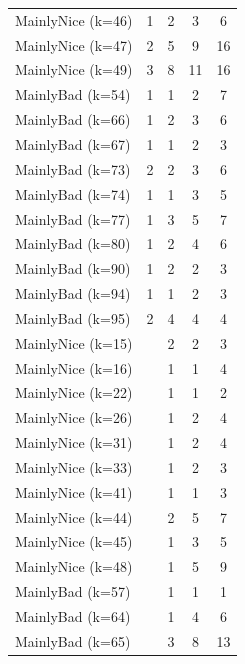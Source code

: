 \documentclass[journal,10pt,twoside]{IEEEtran}
\begin{document}
\begin{table}[ht]
\begin{minipage}{.35\textwidth}
\begin{tabular}{l|cccc}
        MainlyNice (k=46)    &    1 &    2 &    3 &    6 \\
        MainlyNice (k=47)    &    2 &    5 &    9 &   16 \\
        MainlyNice (k=49)    &    3 &    8 &   11 &   16 \\
        MainlyBad (k=54)     &    1 &    1 &    2 &    7 \\
        MainlyBad (k=66)     &    1 &    2 &    3 &    6 \\
        MainlyBad (k=67)     &    1 &    1 &    2 &    3 \\
        MainlyBad (k=73)     &    2 &    2 &    3 &    6 \\
        MainlyBad (k=74)     &    1 &    1 &    3 &    5 \\
        MainlyBad (k=77)     &    1 &    3 &    5 &    7 \\
        MainlyBad (k=80)     &    1 &    2 &    4 &    6 \\
        MainlyBad (k=90)     &    1 &    2 &    2 &    3 \\
        MainlyBad (k=94)     &    1 &    1 &    2 &    3 \\
        MainlyBad (k=95)     &    2 &    4 &    4 &    4 \\
        MainlyNice (k=15)    &      &    2 &    2 &    3 \\
        MainlyNice (k=16)    &      &    1 &    1 &    4 \\
        MainlyNice (k=22)    &      &    1 &    1 &    2 \\
        MainlyNice (k=26)    &      &    1 &    2 &    4 \\
        MainlyNice (k=31)    &      &    1 &    2 &    4 \\
        MainlyNice (k=33)    &      &    1 &    2 &    3 \\
        MainlyNice (k=41)    &      &    1 &    1 &    3 \\
        MainlyNice (k=44)    &      &    2 &    5 &    7 \\
        MainlyNice (k=45)    &      &    1 &    3 &    5 \\
        MainlyNice (k=48)    &      &    1 &    5 &    9 \\
        MainlyBad (k=57)     &      &    1 &    1 &    1 \\
        MainlyBad (k=64)     &      &    1 &    4 &    6 \\
        MainlyBad (k=65)     &      &    3 &    8 &   13 \\

\end{tabular}
\end{minipage}
\end{table}
\end{document}
